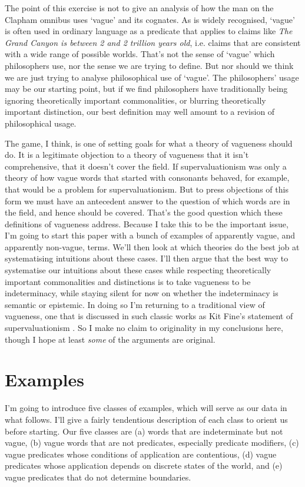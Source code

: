 The point of this exercise is not to give an analysis of how the man on the Clapham omnibus uses `vague' and its cognates. As is widely recognised, `vague' is often used in ordinary language as a predicate that applies to claims like \textit{The Grand Canyon is between 2 and 2 trillion years old},  i.e. claims that are consistent with a wide range of possible worlds. That's not the sense of `vague' which philosophers use, nor the sense we are trying to define. But nor should we think we are just trying to analyse philosophical use of `vague'. The philosophers' usage may be our starting point, but if we find philosophers have traditionally being ignoring theoretically important commonalities, or blurring theoretically important distinction, our best definition may well amount to a revision of philosophical usage.

The game, I think, is one of setting goals for what a theory of vagueness should do. It is a legitimate objection to a theory of vagueness that it isn't comprehensive, that it doesn't cover the field. If supervaluationism was only a theory of how vague words that started with consonants behaved, for example, that would be a problem for supervaluationism. But to press objections of this form we must have an antecedent answer to the question of which words are in the field, and hence should be covered. That's the good question which these definitions of vagueness address. Because I take this to be the important issue, I'm going to start this paper with a bunch of examples of apparently vague, and apparently non-vague, terms. We'll then look at which theories do the best job at systematising intuitions about these cases. I'll then argue that the best way to systematise our intuitions about these cases while respecting theoretically important commonalities and distinctions is to take vagueness to be indeterminacy, while staying silent for now on whether the indeterminacy is semantic or epistemic. In doing so I'm returning to a traditional view of vagueness, one that is discussed in such classic works as Kit Fine's statement of supervaluationism \citep{Fine1975a}. So I make no claim to originality in my conclusions here, though I hope at least \textit{some} of the arguments are original.


\section{Examples}

I'm going to introduce five classes of examples, which will serve as our data in what follows. I'll give a fairly tendentious description of each class to orient us before starting. Our five classes are (a) words that are indeterminate but not vague, (b) vague words that are not predicates, especially predicate modifiers, (c) vague predicates whose conditions of application are contentious, (d) vague predicates whose application depends on discrete states of the world, and (e) vague predicates that do not determine boundaries.


